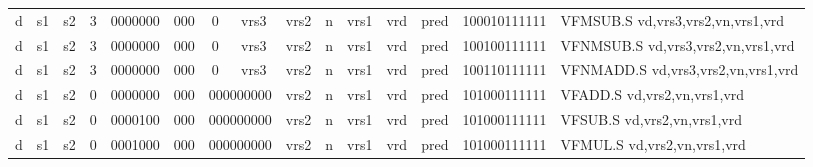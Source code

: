 \begin{landscape}
\begin{table}[p]
\begin{small}
\begin{center}
\begin{tabular}{p{0.08in}@{}p{0.08in}@{}p{0.08in}@{}p{0.08in}@{}p{0.50in}@{}p{0.30in}@{}p{0.08in}@{}p{0.8in}@{}p{0.48in}@{}p{0.32in}@{}p{0.08in}@{}p{0.8in}@{}p{0.8in}@{}p{0.4in}@{}p{0.56in}l}
\multicolumn{1}{|c|}{d} &
\multicolumn{1}{c|}{s1} &
\multicolumn{1}{c|}{s2} &
\multicolumn{1}{c|}{3} &
\multicolumn{1}{c|}{0000000} &
\multicolumn{1}{c|}{000} &
\multicolumn{1}{c|}{0} &
\multicolumn{1}{c|}{vrs3} &
\multicolumn{2}{c|}{vrs2} &
\multicolumn{1}{c|}{n} &
\multicolumn{1}{c|}{vrs1} &
\multicolumn{1}{c|}{vrd} &
\multicolumn{1}{c|}{pred} &
\multicolumn{1}{c|}{100010111111} & VFMSUB.S vd,vrs3,vrs2,vn,vrs1,vrd \\
\cline{1-15}
  

\multicolumn{1}{|c|}{d} &
\multicolumn{1}{c|}{s1} &
\multicolumn{1}{c|}{s2} &
\multicolumn{1}{c|}{3} &
\multicolumn{1}{c|}{0000000} &
\multicolumn{1}{c|}{000} &
\multicolumn{1}{c|}{0} &
\multicolumn{1}{c|}{vrs3} &
\multicolumn{2}{c|}{vrs2} &
\multicolumn{1}{c|}{n} &
\multicolumn{1}{c|}{vrs1} &
\multicolumn{1}{c|}{vrd} &
\multicolumn{1}{c|}{pred} &
\multicolumn{1}{c|}{100100111111} & VFNMSUB.S vd,vrs3,vrs2,vn,vrs1,vrd \\
\cline{1-15}
  

\multicolumn{1}{|c|}{d} &
\multicolumn{1}{c|}{s1} &
\multicolumn{1}{c|}{s2} &
\multicolumn{1}{c|}{3} &
\multicolumn{1}{c|}{0000000} &
\multicolumn{1}{c|}{000} &
\multicolumn{1}{c|}{0} &
\multicolumn{1}{c|}{vrs3} &
\multicolumn{2}{c|}{vrs2} &
\multicolumn{1}{c|}{n} &
\multicolumn{1}{c|}{vrs1} &
\multicolumn{1}{c|}{vrd} &
\multicolumn{1}{c|}{pred} &
\multicolumn{1}{c|}{100110111111} & VFNMADD.S vd,vrs3,vrs2,vn,vrs1,vrd \\
\cline{1-15}
  

\multicolumn{1}{|c|}{d} &
\multicolumn{1}{c|}{s1} &
\multicolumn{1}{c|}{s2} &
\multicolumn{1}{c|}{0} &
\multicolumn{1}{c|}{0000000} &
\multicolumn{1}{c|}{000} &
\multicolumn{2}{c|}{000000000} &
\multicolumn{2}{c|}{vrs2} &
\multicolumn{1}{c|}{n} &
\multicolumn{1}{c|}{vrs1} &
\multicolumn{1}{c|}{vrd} &
\multicolumn{1}{c|}{pred} &
\multicolumn{1}{c|}{101000111111} & VFADD.S vd,vrs2,vn,vrs1,vrd \\
\cline{1-15}
  

\multicolumn{1}{|c|}{d} &
\multicolumn{1}{c|}{s1} &
\multicolumn{1}{c|}{s2} &
\multicolumn{1}{c|}{0} &
\multicolumn{1}{c|}{0000100} &
\multicolumn{1}{c|}{000} &
\multicolumn{2}{c|}{000000000} &
\multicolumn{2}{c|}{vrs2} &
\multicolumn{1}{c|}{n} &
\multicolumn{1}{c|}{vrs1} &
\multicolumn{1}{c|}{vrd} &
\multicolumn{1}{c|}{pred} &
\multicolumn{1}{c|}{101000111111} & VFSUB.S vd,vrs2,vn,vrs1,vrd \\
\cline{1-15}
  

\multicolumn{1}{|c|}{d} &
\multicolumn{1}{c|}{s1} &
\multicolumn{1}{c|}{s2} &
\multicolumn{1}{c|}{0} &
\multicolumn{1}{c|}{0001000} &
\multicolumn{1}{c|}{000} &
\multicolumn{2}{c|}{000000000} &
\multicolumn{2}{c|}{vrs2} &
\multicolumn{1}{c|}{n} &
\multicolumn{1}{c|}{vrs1} &
\multicolumn{1}{c|}{vrd} &
\multicolumn{1}{c|}{pred} &
\multicolumn{1}{c|}{101000111111} & VFMUL.S vd,vrs2,vn,vrs1,vrd \\
\cline{1-15}
  


\end{tabular}
\end{center}
\end{small}
\end{table}
\end{landscape}
